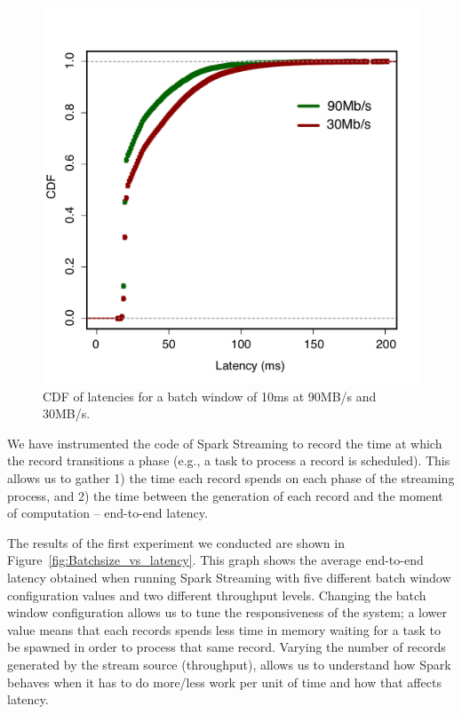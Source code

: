 \begin{figure}[t!]
  \begin{center}
    \includegraphics[scale=0.48]{images_graphs/cdf_latencies/cdf_e2e_times.pdf}
  \end{center}
  \caption{CDF of latencies for a batch window of 10ms at 90MB/s and 30MB/s.}
  \label{fig:CDF_latencies}
\end{figure}

We have instrumented the code of Spark Streaming to record the time at which the record transitions a phase (e.g., a task to process a record is scheduled).
This allows us to gather 1) the time each record spends on each phase of the streaming process, and 2) the time between the generation of each record and the moment of computation -- end-to-end latency.


The results of the first experiment we conducted are shown in Figure~\ref{fig:Batchsize_vs_latency}.
This graph shows the average end-to-end latency obtained when running Spark Streaming with five different batch window configuration values and two different throughput levels.
Changing the batch window configuration allows us to tune the responsiveness of the system;
a lower value means that each records spends less time in memory waiting for a task to be spawned in order to process that same record. 
Varying the number of records generated by the stream source (throughput), allows us to understand how 
Spark behaves when it has to do more/less work per unit of time and how that affects latency.

